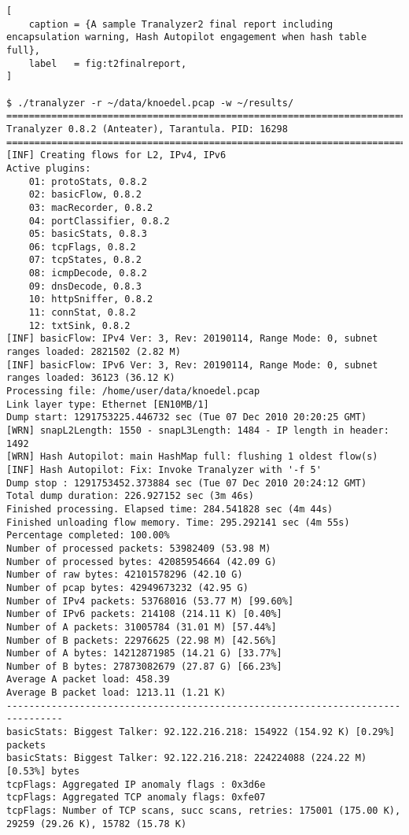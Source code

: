 \begin{lstlisting}[
    caption = {A sample Tranalyzer2 final report including encapsulation warning, Hash Autopilot engagement when hash table full},
    label   = fig:t2finalreport,
]

$ ./tranalyzer -r ~/data/knoedel.pcap -w ~/results/
================================================================================
Tranalyzer 0.8.2 (Anteater), Tarantula. PID: 16298
================================================================================
[INF] Creating flows for L2, IPv4, IPv6
Active plugins:
    01: protoStats, 0.8.2
    02: basicFlow, 0.8.2
    03: macRecorder, 0.8.2
    04: portClassifier, 0.8.2
    05: basicStats, 0.8.3
    06: tcpFlags, 0.8.2
    07: tcpStates, 0.8.2
    08: icmpDecode, 0.8.2
    09: dnsDecode, 0.8.3
    10: httpSniffer, 0.8.2
    11: connStat, 0.8.2
    12: txtSink, 0.8.2
[INF] basicFlow: IPv4 Ver: 3, Rev: 20190114, Range Mode: 0, subnet ranges loaded: 2821502 (2.82 M)
[INF] basicFlow: IPv6 Ver: 3, Rev: 20190114, Range Mode: 0, subnet ranges loaded: 36123 (36.12 K)
Processing file: /home/user/data/knoedel.pcap
Link layer type: Ethernet [EN10MB/1]
Dump start: 1291753225.446732 sec (Tue 07 Dec 2010 20:20:25 GMT)
[WRN] snapL2Length: 1550 - snapL3Length: 1484 - IP length in header: 1492
[WRN] Hash Autopilot: main HashMap full: flushing 1 oldest flow(s)
[INF] Hash Autopilot: Fix: Invoke Tranalyzer with '-f 5'
Dump stop : 1291753452.373884 sec (Tue 07 Dec 2010 20:24:12 GMT)
Total dump duration: 226.927152 sec (3m 46s)
Finished processing. Elapsed time: 284.541828 sec (4m 44s)
Finished unloading flow memory. Time: 295.292141 sec (4m 55s)
Percentage completed: 100.00%
Number of processed packets: 53982409 (53.98 M)
Number of processed bytes: 42085954664 (42.09 G)
Number of raw bytes: 42101578296 (42.10 G)
Number of pcap bytes: 42949673232 (42.95 G)
Number of IPv4 packets: 53768016 (53.77 M) [99.60%]
Number of IPv6 packets: 214108 (214.11 K) [0.40%]
Number of A packets: 31005784 (31.01 M) [57.44%]
Number of B packets: 22976625 (22.98 M) [42.56%]
Number of A bytes: 14212871985 (14.21 G) [33.77%]
Number of B bytes: 27873082679 (27.87 G) [66.23%]
Average A packet load: 458.39
Average B packet load: 1213.11 (1.21 K)
--------------------------------------------------------------------------------
basicStats: Biggest Talker: 92.122.216.218: 154922 (154.92 K) [0.29%] packets
basicStats: Biggest Talker: 92.122.216.218: 224224088 (224.22 M) [0.53%] bytes
tcpFlags: Aggregated IP anomaly flags : 0x3d6e
tcpFlags: Aggregated TCP anomaly flags: 0xfe07
tcpFlags: Number of TCP scans, succ scans, retries: 175001 (175.00 K), 29259 (29.26 K), 15782 (15.78 K)

\end{lstlisting}
